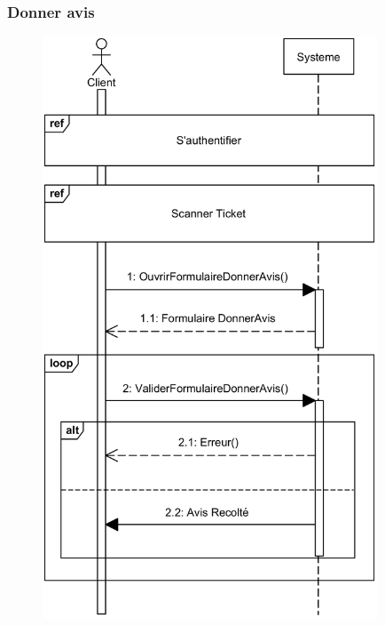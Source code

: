     \subsubsection[Donner avis]{Donner avis}
        \begin{figure}[H]
            \centering
            \includegraphics[width=100mm]{images/diagramme-de-sequence/sd-donner-avis.png}
            \label{fig:sdDonnerAvis}
        \end{figure}
\pagebreak
